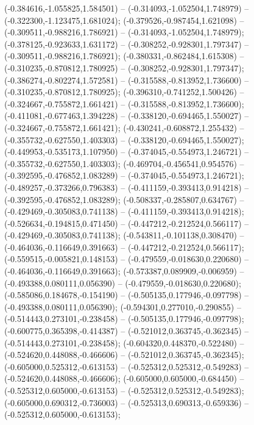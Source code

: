  (-0.384616,-1.055825,1.584501) -- (-0.314093,-1.052504,1.748979) -- (-0.322300,-1.123475,1.681024);
 (-0.379526,-0.987454,1.621098) -- (-0.309511,-0.988216,1.786921) -- (-0.314093,-1.052504,1.748979);
 (-0.378125,-0.923633,1.631172) -- (-0.308252,-0.928301,1.797347) -- (-0.309511,-0.988216,1.786921);
 (-0.380331,-0.862484,1.615308) -- (-0.310235,-0.870812,1.780925) -- (-0.308252,-0.928301,1.797347);
 (-0.386274,-0.802274,1.572581) -- (-0.315588,-0.813952,1.736600) -- (-0.310235,-0.870812,1.780925);
 (-0.396310,-0.741252,1.500426) -- (-0.324667,-0.755872,1.661421) -- (-0.315588,-0.813952,1.736600);
 (-0.411081,-0.677463,1.394228) -- (-0.338120,-0.694465,1.550027) -- (-0.324667,-0.755872,1.661421);
 (-0.430241,-0.608872,1.255432) -- (-0.355732,-0.627550,1.403303) -- (-0.338120,-0.694465,1.550027);
 (-0.449953,-0.535173,1.107950) -- (-0.374045,-0.554973,1.246721) -- (-0.355732,-0.627550,1.403303);
 (-0.469704,-0.456541,0.954576) -- (-0.392595,-0.476852,1.083289) -- (-0.374045,-0.554973,1.246721);
 (-0.489257,-0.373266,0.796383) -- (-0.411159,-0.393413,0.914218) -- (-0.392595,-0.476852,1.083289);
 (-0.508337,-0.285807,0.634767) -- (-0.429469,-0.305083,0.741138) -- (-0.411159,-0.393413,0.914218);
 (-0.526634,-0.194815,0.471450) -- (-0.447212,-0.212524,0.566117) -- (-0.429469,-0.305083,0.741138);
 (-0.543811,-0.101138,0.308470) -- (-0.464036,-0.116649,0.391663) -- (-0.447212,-0.212524,0.566117);
 (-0.559515,-0.005821,0.148153) -- (-0.479559,-0.018630,0.220680) -- (-0.464036,-0.116649,0.391663);
 (-0.573387,0.089909,-0.006959) -- (-0.493388,0.080111,0.056390) -- (-0.479559,-0.018630,0.220680);
 (-0.585086,0.184678,-0.154190) -- (-0.505135,0.177946,-0.097798) -- (-0.493388,0.080111,0.056390);
 (-0.594301,0.277010,-0.290855) -- (-0.514443,0.273101,-0.238458) -- (-0.505135,0.177946,-0.097798);
 (-0.600775,0.365398,-0.414387) -- (-0.521012,0.363745,-0.362345) -- (-0.514443,0.273101,-0.238458);
 (-0.604320,0.448370,-0.522480) -- (-0.524620,0.448088,-0.466606) -- (-0.521012,0.363745,-0.362345);
 (-0.605000,0.525312,-0.613153) -- (-0.525312,0.525312,-0.549283) -- (-0.524620,0.448088,-0.466606);
 (-0.605000,0.605000,-0.684450) -- (-0.525312,0.605000,-0.613153) -- (-0.525312,0.525312,-0.549283);
 (-0.605000,0.690312,-0.736003) -- (-0.525313,0.690313,-0.659336) -- (-0.525312,0.605000,-0.613153);
